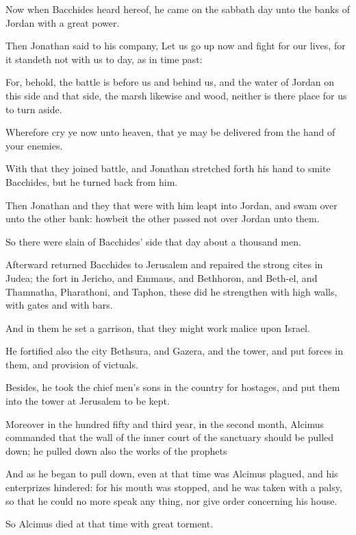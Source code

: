 {\par }{\PP {}Now when Bacchides heard hereof, he came on the sabbath day unto the banks of Jordan with a great power.
\par }{\PP {}Then Jonathan said to his company, Let us go up now and fight for our lives, for it standeth not with us to day, as in time past:
\par }{\PP {}For, behold, the battle is before us and behind us, and the water of Jordan on this side and that side, the marsh likewise and wood, neither is there place for us to turn aside.
\par }{\PP {}Wherefore cry ye now unto heaven, that ye may be delivered from the hand of your enemies.
\par }{\PP {}With that they joined battle, and Jonathan stretched forth his hand to smite Bacchides, but he turned back from him.
\par }{\PP {}Then Jonathan and they that were with him leapt into Jordan, and swam over unto the other bank: howbeit the other passed not over Jordan unto them.
\par }{\PP {}So there were slain of Bacchides’ side that day about a thousand men.
\par }{\PP {}Afterward returned Bacchides to Jerusalem and repaired the strong cites in Judea; the fort in Jericho, and Emmaus, and Bethhoron, and Beth-el, and Thamnatha, Pharathoni, and Taphon, these did he strengthen with high walls, with gates and with bars.
\par }{\PP {}And in them he set a garrison, that they might work malice upon Israel.
\par }{\PP {}He fortified also the city Bethsura, and Gazera, and the tower, and put forces in them, and provision of victuals.
\par }{\PP {}Besides, he took the chief men’s sons in the country for hostages, and put them into the tower at Jerusalem to be kept.
\par }{\PP {}Moreover in the hundred fifty and third year, in the second month, Alcimus commanded that the wall of the inner court of the sanctuary should be pulled down; he pulled down also the works of the prophets
\par }{\PP {}And as he began to pull down, even at that time was Alcimus plagued, and his enterprizes hindered: for his mouth was stopped, and he was taken with a palsy, so that he could no more speak any thing, nor give order concerning his house.
\par }{\PP {}So Alcimus died at that time with great torment.
}
